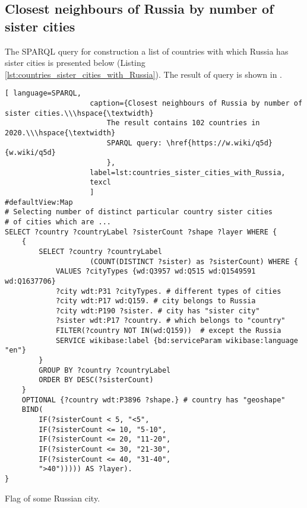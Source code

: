 \subsection{Closest neighbours of Russia by number of sister cities}

The SPARQL query for construction a list of countries with which Russia has sister cities is presented below (Listing \ref{lst:countries_sister_cities_with_Russia}). The result of query is shown in .

\begin{lstlisting}[ language=SPARQL, 
                    caption={Closest neighbours of Russia by number of sister cities.\\\hspace{\textwidth}
                        The result contains 102 countries in 2020.\\\hspace{\textwidth}
                        SPARQL query: \href{https://w.wiki/q5d}{w.wiki/q5d}
                        },
                    label=lst:countries_sister_cities_with_Russia,
                    texcl 
                    ]
#defaultView:Map
# Selecting number of distinct particular country sister cities 
# of cities which are ...
SELECT ?country ?countryLabel ?sisterCount ?shape ?layer WHERE {
	{ 
		SELECT ?country ?countryLabel 
					(COUNT(DISTINCT ?sister) as ?sisterCount) WHERE {  
			VALUES ?cityTypes {wd:Q3957 wd:Q515 wd:Q1549591 wd:Q1637706}
			?city wdt:P31 ?cityTypes. # different types of cities
			?city wdt:P17 wd:Q159. # city belongs to Russia
			?city wdt:P190 ?sister. # city has "sister city"
			?sister wdt:P17 ?country. # which belongs to "country"
			FILTER(?country NOT IN(wd:Q159))  # except the Russia
			SERVICE wikibase:label {bd:serviceParam wikibase:language "en"}
		}
		GROUP BY ?country ?countryLabel
		ORDER BY DESC(?sisterCount)
	}
	OPTIONAL {?country wdt:P3896 ?shape.} # country has "geoshape"
	BIND(
		IF(?sisterCount < 5, "<5",
		IF(?sisterCount <= 10, "5-10",
		IF(?sisterCount <= 20, "11-20",
		IF(?sisterCount <= 30, "21-30",
		IF(?sisterCount <= 40, "31-40",
		">40"))))) AS ?layer).
}
\end{lstlisting}%


\begin{marginfigure}
{
\setlength{\fboxsep}{0pt}%
\setlength{\fboxrule}{1pt}%
%
}
  \caption{Flag of some Russian city.}%
\end{marginfigure}

